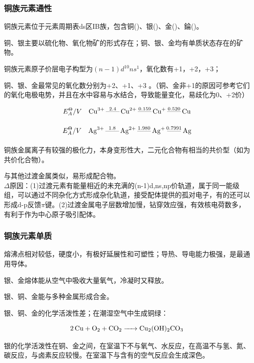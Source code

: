 \documentclass[a4paper,UTF8]{article}
\begin{document}
\subsubsection{铜族元素通性}

铜族元素位于元素周期表ds区IB族，包含铜()、银()、金()、錀()。

铜、银主要以硫化物、氧化物矿的形式存在；铜、银、金均有单质状态存在的矿物。

铜族元素原子价层电子构型为$(n-1)d^{10}ns^{1}$，氧化数有+1，+2，+3；

铜、银、金最常见的氧化数分别为+2、+1、+3 。（铜、金非+1的原因可参考它们的氧化电极电势，并且在水中容易与水结合，导致能量变化，易歧化为0、+2价）

$$ E^{\Theta}_{A}/V \quad \ce{Cu^{3+} \overset{2.4}{\text{------}} Cu^{2+} \overset{0.159}{\underset{}{\text{------}}} Cu+ \overset{0.520}{\underset{}{\text{------}}} Cu}$$

$$ E^{\Theta}_{A}/V  \quad \ce{Ag^{3+} \overset{1.8}{\underset{}{\text{------}}} Ag^{2+} \overset{1.980}{\underset{}{\text{------}}} Ag+ \overset{0.7991}{\underset{}{\text{------}}} Ag} $$




铜族金属离子有较强的极化力，本身变形性大，二元化合物有相当的共价型（如为共价化合物）。

与其他过渡金属类似，易形成配合物。\\$\Delta$原因：(1)过渡元素有能量相近的未充满的(n-1)d,ns,np价轨道，属于同一能级组，可以通过不同杂化方式形成杂化轨道，接受配体提供的孤对电子，有的还可以形成d-p反馈$\pi$键。(2)过渡金属电子层数增加慢，钻穿效应强，有效核电荷数多，有利于作为中心原子吸引配体。

\subsubsection{铜族元素单质}
熔沸点相对较低，硬度小，有极好延展性和可塑性；导热、导电能力极强，是最通用导体。

银、金熔体能从空气中吸收大量氧气，冷凝时又释放。

银、铜、金能与多种金属形成合金。

银、铜、金的化学活泼性差；在潮湿空气中生成铜绿：

$$ \ce{2Cu + O2 + CO2 -> Cu2(OH)2CO3} $$

银的化学活泼性在铜、金之间，在室温下不与氧气、水反应，在高温不与氢、氮、碳反应，与卤素反应较慢。在室温下与含有的空气反应会生成深色。
\end{document}
